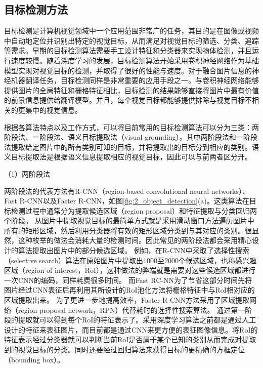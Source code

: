 
\subsection{目标检测方法}
\label{sec:2_object_detection}

目标检测是计算机视觉领域中一个应用范围非常广的任务，其目的是在图像或视频中自动地定位并识别出特定的视觉目标，从而满足对视觉目标的筛选、分类、追踪等需求。早期的目标检测算法需要手工设计特征和分类器来实现物体检测，并且运行速度较慢。随着深度学习的发展，目标检测算法开始采用卷积神经网络作为基础模型实现对视觉目标的检测，并取得了很好的性能与速度。对于融合图片信息的神经机器翻译任务，目标检测同样是非常重要的应用手段之一。与卷积神经网络能够提供图片的全局特征和栅格特征相比，目标检测的结果能够直接将图片中最有价值的前景信息提供给翻译模型。并且，每个视觉目标都能够提供排除与视觉目标不相关的更集中的视觉信息。

根据各算法特点以及工作方式，可以将目前常用的目标检测算法可以分为三类：两阶段法、一阶段法、语义目标提取法（visual grounding）。其中两阶段法和一阶段法提取给定图片中的所有类别可知的目标，并将提取出的目标分到相应的类别。语义目标提取法是根据语义信息提取相应的视觉目标，因此可以与前两者区分开。

{\sffamily （1）两阶段法}

两阶段法的代表方法有R-CNN（region-based convolutional neural networks）、Fast R-CNN以及Faster R-CNN，如图\ref{fig:2_object_detection}(a)。这类算法在目标检测过程中通常分为提取候选区域（region proposal）和特征提取与分类回归两个阶段。
从图片中提取视觉目标的最简单方式就是采用滑动窗口方法遍历图片中所有的矩形区域，然后利用分类器将有效的矩形区域分类到与其对应的类别。很显然，这种枚举的做法会消耗大量的检测时间。因此常见的两阶段法都会采用精心设计的算法提取出图片中的部分候选区域。
例如，在R-CNN中采取了选择性搜索（selective search）算法在原始图片中提取出1000至2000个候选区域，也称感兴趣区域（region of interest，RoI），这种做法的弊端就是需要对这些候选区域都进行一次CNN的编码，同样耗费很多时间。
而Fast RC-NN为了节省这部分时间先将图片经过CNN表征后再利用其所设计的RoI池化方法将栅格特征中与RoI相对应的区域提取出来。
为了更进一步地提高效率，Faster R-CNN方法采用了区域提取网络（region proposal network，RPN）代替耗时的选择性搜索算法。
通过第一阶段的提取就可以得到每个RoI的特征表示了。采用深度学习算法之前都是通过人工设计的特征来表征图片，而目前都是通过CNN来更方便的表征图像信息。将RoI的特征表示经过分类器就可以判断当前RoI是否属于某个已知的类别从而完成对提取到的视觉目标的分类。同时还要经过回归算法来获得目标的更精确的方框定位（bounding box）。

